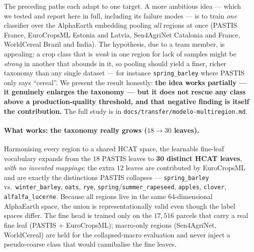 The preceding paths each adapt to one target. A more ambitious idea --- which we tested and
report here in full, including its failure modes --- is to train \emph{one} classifier over
the AlphaEarth embedding pooling \emph{all} regions at once (PASTIS France, EuroCropsML
Estonia and Latvia, Sen4AgriNet Catalonia and France, WorldCereal Brazil and India). The
hypothesis, due to a team member, is appealing: a crop class that is \emph{weak} in one
region for lack of samples might be \emph{strong} in another that abounds in it, so pooling
should yield a finer, richer taxonomy than any single dataset --- for instance
\texttt{spring\_barley} where PASTIS only says ``cereal''. We present the result honestly:
\textbf{the idea works partially --- it genuinely enlarges the taxonomy --- but it does not
rescue any class above a production-quality threshold, and that negative finding is itself
the contribution.} The full study is in \texttt{docs/transfer/modelo-multiregion.md}.

\paragraph{What works: the taxonomy really grows ($18\rightarrow30$ leaves).}
Harmonising every region to a shared HCAT space, the learnable fine-leaf vocabulary expands
from the $18$ PASTIS leaves to \textbf{30 distinct HCAT leaves}, \emph{with no invented
mappings}: the extra $12$ leaves are contributed by EuroCropsML and are exactly the
distinctions PASTIS collapses --- \texttt{spring\_barley} vs.\ \texttt{winter\_barley},
\texttt{oats}, \texttt{rye}, \texttt{spring}/\texttt{summer\_rapeseed}, \texttt{apples},
\texttt{clover}, \texttt{alfalfa\_lucerne}. Because all regions live in the same
64-dimensional AlphaEarth space, the union is representationally valid even though the label
spaces differ. The fine head is trained only on the $17{,}516$ parcels that carry a real
fine leaf (PASTIS $+$ EuroCropsML); macro-only regions (Sen4AgriNet, WorldCereal) are held
for the collapsed-macro evaluation and never inject a pseudo-coarse class that would
cannibalise the fine leaves.

